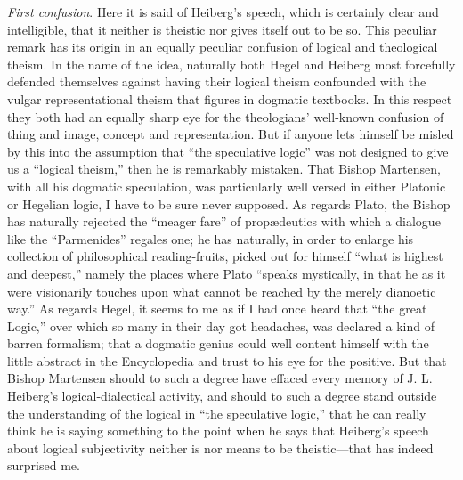 \documentclass[12pt]{book}
\newcommand{\opage}[1]{\marginnote{\footnotesize\textit{[#1]}}}
\begin{document}
\emph{First confusion}. Here it is said of Heiberg's speech, which is certainly clear and intelligible, that it neither is theistic nor gives itself out to be so. This peculiar remark has its origin in an equally peculiar confusion of logical and theological theism. In the name of the idea, naturally both Hegel and Heiberg most forcefully defended themselves against having their logical theism confounded with the vulgar representational theism that figures in dogmatic textbooks. In this respect they both had an equally sharp eye for the theologians' well-known confusion of thing and image, concept and representation. But if anyone lets himself be misled by this into the assumption that ``the speculative logic'' was not designed to give us a ``logical theism,'' then he is remarkably mistaken. That Bishop Martensen, with all his dogmatic speculation, was particularly well versed in either Platonic or Hegelian logic, I have to be sure never supposed. As regards Plato, the Bishop has naturally rejected the ``meager fare'' of propædeutics with which a dialogue like the ``Parmenides'' regales one; he has naturally, in order to enlarge his collection of philosophical reading-fruits, picked out for himself ``what is highest and deepest,'' namely the places where Plato ``speaks mystically, in that he as it were visionarily touches upon what cannot be reached by the merely dianoetic way.'' As regards Hegel, it seems to me as if I had once heard that ``the great Logic,'' over which so many in their
\opage{122}\setcounter{footnote}{0}%
day got headaches, was declared a kind of barren formalism; that a dogmatic genius could well content himself with the little abstract in the Encyclopedia and trust to his eye for the positive. But that Bishop Martensen should to such a degree have effaced every memory of J. L. Heiberg's logical-dialectical activity, and should to such a degree stand outside the understanding of the logical in ``the speculative logic,'' that he can really think he is saying something to the point when he says that Heiberg's speech about logical subjectivity neither is nor means to be theistic---that has indeed surprised me.
\end{document}

